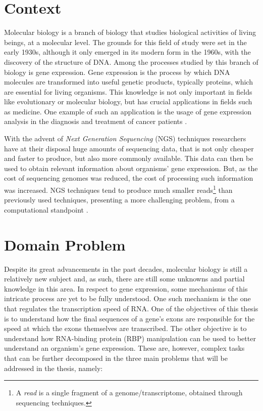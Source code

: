 \documentclass[9pt,a4paper]{extarticle}
\begin{document}
\begin{multicols}{2}

\section{Context} \label{sec:context}

Molecular biology is a branch of biology that studies biological activities of
living beings, at a molecular level. The grounds for this field of study were
set in the early 1930s, although it only emerged in its modern form in the
1960s, with the discovery of the structure of DNA. Among the processes studied
by this branch of biology is gene expression. Gene expression is the process by
which DNA molecules are transformed into useful genetic products, typically
proteins, which are essential for living organisms. This knowledge is not only
important in fields like evolutionary or molecular biology, but has crucial
applications in fields such as medicine. One example of such an application is
the usage of gene expression analysis in the diagnosis and treatment of cancer
patients \cite{Pusztai01062003}.

With the advent of \textit{Next Generation Sequencing} (NGS) techniques
researchers have at their disposal huge amounts of sequencing data, that is not
only cheaper and faster to produce, but also more commonly available. This data
can then be used to obtain relevant information about organisms' gene
expression. But, as the cost of sequencing genomes was reduced, the cost of
processing such information was increased. NGS techniques tend to produce much
smaller reads\footnote{A \textit{read} is a single fragment of a
genome/transcriptome, obtained through sequencing techniques.} than previously
used techniques, presenting a more challenging problem, from a computational
standpoint \cite{Wolf2013}.

\section{Domain Problem} \label{sec:problem}

Despite its great advancements in the past decades, molecular biology is still a
relatively new subject and, as such, there are still some unknowns and partial
knowledge in this area. In respect to gene expression, some mechanisms of this
intricate process are yet to be fully understood. One such mechanism is the one
that regulates the transcription speed of RNA. One of the objectives of this
thesis is to understand how the final sequences of a gene's exons are
responsible for the speed at which the exons themselves are transcribed. The
other objective is to understand how RNA-binding protein (RBP) manipulation can
be used to better understand an organism's gene expression. These are, however,
complex tasks that can be further decomposed in the three main problems that
will be addressed in the thesis, namely:


\end{multicols}
\end{document}

